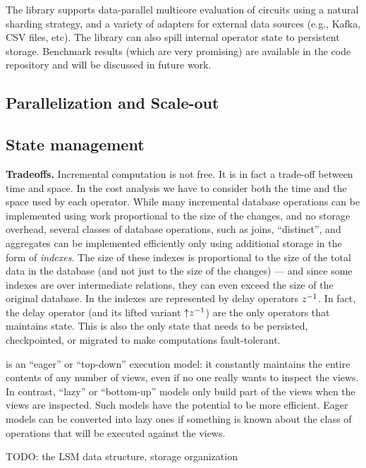 The library supports data-parallel multicore evaluation of circuits
using a natural sharding strategy, and a variety of adapters for
external data sources (e.g., Kafka, CSV files, etc).  The library can
also spill internal operator state to persistent storage.  Benchmark
results (which are very promising) are available in the code
repository and will be discussed in future work.

\subsection{Parallelization and Scale-out}

\subsection{State management}

\textbf{Tradeoffs.}  Incremental computation is not free.  It is in
fact a trade-off between time and space.  In the cost analysis we have
to consider both the time and the space used by each operator.  While
many incremental database operations can be implemented using work
proportional to the size of the changes, and no storage overhead,
several classes of database operations, such as joins, ``distinct'',
and aggregates can be implemented efficiently only using additional
storage in the form of \emph{indexes}.  The size of these indexes is
proportional to the size of the total data in the database (and not
just to the size of the changes) --- and since some indexes are over
intermediate relations, they can even exceed the size of the original
database.  In \dbsp the indexes are represented by delay operators
$z^{-1}$.  In fact, the delay operator (and its lifted variant
${\uparrow}z^{-1}$) are the only operators that maintains state.  This is
also the only state that needs to be persisted, checkpointed, or
migrated to make \dbsp computations fault-tolerant.

\dbsp is an ``eager'' or ``top-down'' execution model: it constantly
maintains the entire contents of any number of views, even if no one
really wants to inspect the views.  In contrast, ``lazy'' or
``bottom-up'' models only build part of the views when the views are
inspected.  Such models have the potential to be more efficient.
Eager models can be converted into lazy ones if something is known
about the class of operations that will be executed against the views.



TODO: the LSM data structure, storage organization

